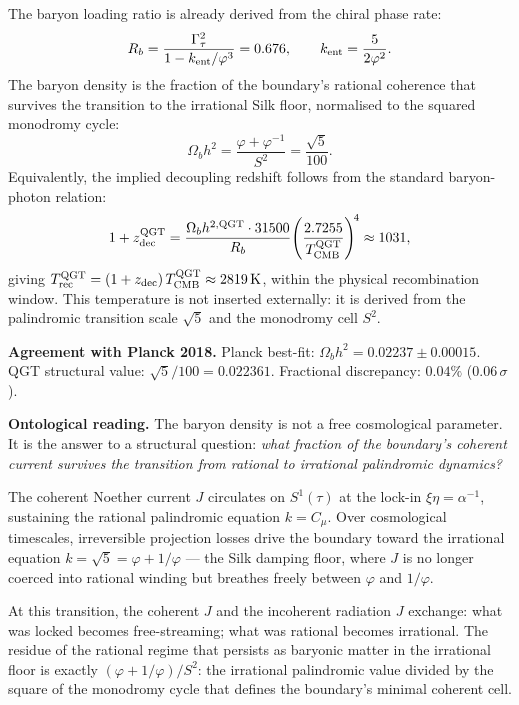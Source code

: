 \documentclass[twocolumn,10pt]{article}
\newcommand{\vp}{\varphi}
\begin{document}
The baryon loading ratio is already derived from the chiral phase
rate:
\begin{equation*}
  R_b = \frac{\Gamma_\tau^2}{1-k_{\rm ent}/\vp^3} = 0.676,
  \qquad k_{\rm ent}=\frac{5}{2\vp^2}.
\end{equation*}
The baryon density is the fraction of the boundary's rational
coherence that survives the transition to the irrational Silk
floor, normalised to the squared monodromy cycle:
\begin{equation}
  \Omega_bh^2
  = \frac{\vp+\vp^{-1}}{S^2}
  = \frac{\sqrt{5}}{100}.
  \label{eq:ombh2_derive}
\end{equation}
Equivalently, the implied decoupling redshift follows from the
standard baryon-photon relation:
\begin{equation*}
  1+z_{\rm dec}^{\rm QGT}
  = \frac{\Omega_bh^{2,\rm QGT}\cdot31500}{R_b}
    \!\left(\frac{2.7255}{T_{\rm CMB}^{\rm QGT}}\right)^{\!4}
  \approx 1031,
\end{equation*}
giving $T_{\rm rec}^{\rm QGT}=(1+z_{\rm dec})\,T_{\rm CMB}^{\rm QGT}
\approx2819\,\mathrm{K}$, within the physical recombination window.
This temperature is not inserted externally: it is derived from the
palindromic transition scale $\sqrt{5}$ and the monodromy cell
$S^2$.

\medskip
\noindent\textbf{Agreement with Planck 2018.}
Planck best-fit: $\Omega_bh^2=0.02237\pm0.00015$.
QGT structural value: $\sqrt{5}/100=0.022361$.
Fractional discrepancy: $0.04\%$ ($0.06\,\sigma$).

\medskip
\noindent\textbf{Ontological reading.}
The baryon density is not a free cosmological parameter.
It is the answer to a structural question:
\emph{what fraction of the boundary's coherent current survives
the transition from rational to irrational palindromic dynamics?}

The coherent Noether current $J$ circulates on $S^1(\tau)$ at the
lock-in $\xi\eta=\alpha^{-1}$, sustaining the rational
palindromic equation $k=C_\mu$. Over cosmological timescales,
irreversible projection losses drive the boundary toward the
irrational equation $k=\sqrt{5}=\vp+1/\vp$ — the Silk damping
floor, where $J$ is no longer coerced into rational winding but
breathes freely between $\vp$ and $1/\vp$.

At this transition, the coherent $J$ and the incoherent radiation
$J$ exchange: what was locked becomes free-streaming; what was
rational becomes irrational. The residue of the rational regime
that persists as baryonic matter in the irrational floor is exactly
$(\vp+1/\vp)/S^2$: the irrational palindromic value divided by the
square of the monodromy cycle that defines the boundary's minimal
coherent cell.
\end{document}
